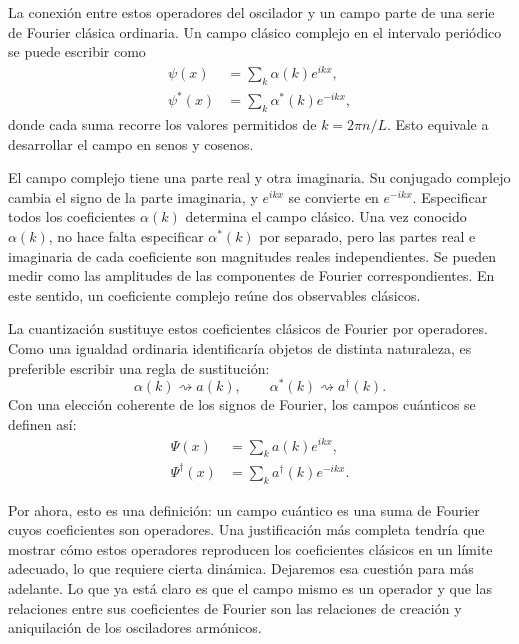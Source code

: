 La conexión entre estos operadores del oscilador y un campo parte de una serie de Fourier clásica ordinaria. Un campo clásico complejo en el intervalo periódico se puede escribir como
\begin{align}
\psi(x)&=\sum_k \alpha(k)e^{ikx},\\
\psi^*(x)&=\sum_k \alpha^*(k)e^{-ikx},
\end{align}
donde cada suma recorre los valores permitidos de \(k=2\pi n/L\). Esto equivale a desarrollar el campo en senos y cosenos.

El campo complejo tiene una parte real y otra imaginaria. Su conjugado complejo cambia el signo de la parte imaginaria, y \(e^{ikx}\) se convierte en \(e^{-ikx}\). Especificar todos los coeficientes \(\alpha(k)\) determina el campo clásico. Una vez conocido \(\alpha(k)\), no hace falta especificar \(\alpha^*(k)\) por separado, pero las partes real e imaginaria de cada coeficiente son magnitudes reales independientes. Se pueden medir como las amplitudes de las componentes de Fourier correspondientes. En este sentido, un coeficiente complejo reúne dos observables clásicos.

La cuantización sustituye estos coeficientes clásicos de Fourier por operadores. Como una igualdad ordinaria identificaría objetos de distinta naturaleza, es preferible escribir una regla de sustitución:
\begin{equation}
\alpha(k)\rightsquigarrow a(k),
\qquad
\alpha^*(k)\rightsquigarrow a^\dagger(k).
\end{equation}
Con una elección coherente de los signos de Fourier, los campos cuánticos se definen así:
\begin{align}
\Psi(x)&=\sum_k a(k)e^{ikx},\\
\Psi^\dagger(x)&=\sum_k a^\dagger(k)e^{-ikx}.
\end{align}

Por ahora, esto es una definición: un campo cuántico es una suma de Fourier cuyos coeficientes son operadores. Una justificación más completa tendría que mostrar cómo estos operadores reproducen los coeficientes clásicos en un límite adecuado, lo que requiere cierta dinámica. Dejaremos esa cuestión para más adelante. Lo que ya está claro es que el campo mismo es un operador y que las relaciones entre sus coeficientes de Fourier son las relaciones de creación y aniquilación de los osciladores armónicos.

